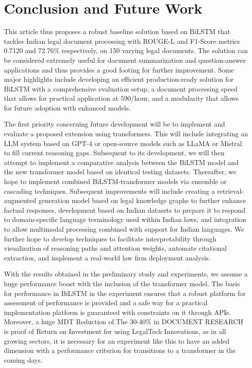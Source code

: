 \documentclass{llncs}
\begin{document}
\section{Conclusion and Future Work}

This article thus proposes a robust baseline solution based on BiLSTM that tackles Indian legal document processing with ROUGE-L and F1-Score metrics 0.7120 and 72.76\% respectively, on 150 varying legal documents. The solution can be considered extremely useful for document summarization and question-answer applications and thus provides a good footing for further improvement. Some major highlights include developing an efficient production-ready solution for BiLSTM with a comprehensive evaluation setup, a document processing speed that allows for practical application at 590/hour, and a modularity that allows for future adoption with enhanced models.

The first priority concerning future development will be to implement and evaluate a proposed extension using transformers. This will include integrating an LLM system based on GPT-4 or open-source models such as LLaMA or Mistral to fill current reasoning gaps. Subsequent to its development, we will then attempt to implement a comparative analysis between the BiLSTM model and the new transformer model based on identical testing datasets. Thereafter, we hope to implement combined BiLSTM-transformer models via ensemble or cascading techniques. Subsequent improvements will include creating a retrieval-augmented generation model based on legal knowledge graphs to further enhance factual responses, development based on Indian datasets to prepare it to respond to domain-specific language terminology used within Indian laws, and integration to allow multimodal processing combined with support for Indian languages. We further hope to develop techniques to facilitate interpretability through visualization of reasoning paths and attention weights, automate citational extraction, and implement a real-world law firm deployment analysis.


With the results obtained in the preliminary study and experiments, we assume a huge performance boost with the inclusion of the transformer model. The basis for performance in BiLSTM in the experiment ensures that a robust platform for assessment of performance is provided and a safe way for a practical implementation platform is guaranteed with constraints on it through APIs. Moreover, a huge MDT Reduction of.The 30-40\% in DOCUMENT RESEARCH is proof of Return on Investment for using LegalTech Innovations, as in all growing sectors, it is necessary for an experiment like this to have an added dimension with a performance criterion for transitions to a transformer in the coming days.
\end{document}

